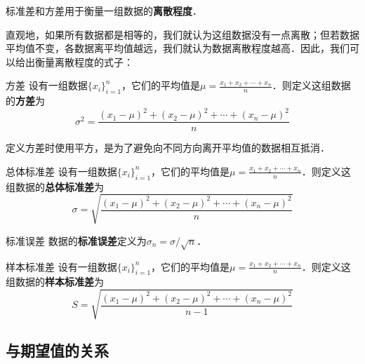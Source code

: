 



标准差和方差用于衡量一组数据的\textbf{离散程度}．

直观地，如果所有数据都是相等的，我们就认为这组数据没有一点离散；但若数据平均值不变，各数据离平均值越远，我们就认为数据离散程度越高．因此，我们可以给出衡量离散程度的式子：

\begin{definition}{方差}\label{StDevi_def1}
设有一组数据$\{x_i\}_{i=1}^n$，它们的平均值是$\mu=\frac{x_1+x_2+\cdots+x_n}{n}$．则定义这组数据的\textbf{方差}为
\begin{equation}\label{StDevi_eq1}
\sigma^2 = \frac{(x_1-\mu)^2+(x_2-\mu)^2+\cdots+(x_n-\mu)^2}{n}
\end{equation}
\end{definition}

定义方差时使用平方，是为了避免向不同方向离开平均值的数据相互抵消．

\begin{definition}{总体标准差}
设有一组数据$\{x_i\}_{i=1}^n$，它们的平均值是$\mu=\frac{x_1+x_2+\cdots+x_n}{n}$．则定义这组数据的\textbf{总体标准差}为
\begin{equation}
\sigma = \sqrt{\frac{(x_1-\mu)^2+(x_2-\mu)^2+\cdots+(x_n-\mu)^2}{n}}
\end{equation}
\end{definition}

\begin{definition}{标准误差}
数据的\textbf{标准误差}定义为$\sigma_n=\sigma/\sqrt{n}$．
\end{definition}





\begin{definition}{样本标准差}
设有一组数据$\{x_i\}_{i=1}^n$，它们的平均值是$\mu=\frac{x_1+x_2+\cdots+x_n}{n}$．则定义这组数据的\textbf{样本标准差}为
\begin{equation}
S = \sqrt{\frac{(x_1-\mu)^2+(x_2-\mu)^2+\cdots+(x_n-\mu)^2}{n-1}}
\end{equation}
\end{definition}


\subsection{与期望值的关系}

